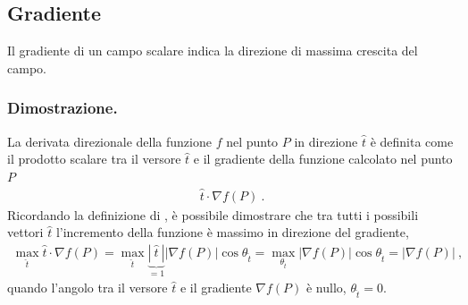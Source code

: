 \documentclass[letterpaper,10pt,english]{jupyterBook}
\begin{document}
\subsection{Gradiente}
\label{\detokenize{ch/vector-calculus/derivatives:gradiente}}
\sphinxAtStartPar
{} 

\sphinxAtStartPar
{} Il gradiente di un campo scalare indica la direzione  di massima crescita del campo.
\subsubsection*{Dimostrazione.}

\sphinxAtStartPar
La derivata direzionale della funzione \(f\) nel punto \(P\) in direzione \(\hat{t}\) è definita come il prodotto scalare tra il versore \(\hat{t}\) e il gradiente della funzione calcolato nel punto \(P\)
\begin{equation*}
\begin{split}\hat{t} \cdot \nabla f(P) \ .\end{split}
\end{equation*}
\sphinxAtStartPar
Ricordando la definizione di {\hyperref[\detokenize{ch/algebra/vector-algebra-euclidean-space:math-hs-algebra-vector-euclidean-space-inner-product}]{}}, è possibile dimostrare che tra tutti i possibili vettori \(\hat{t}\) l’incremento della funzione è massimo in direzione del gradiente,
\begin{equation*}
\begin{split}\max_{\hat{t}} \hat{t} \cdot \nabla f(P) = \max_{\hat{t}} \underbrace{|\ \hat{t} \ |}_{=1} |\nabla f(P)| \cos \theta_{\hat{t}} = \max_{\theta_{\hat{t}}} |\nabla f(P)| \cos \theta_{\hat{t}} = |\nabla f(P)| \ ,\end{split}
\end{equation*}
\sphinxAtStartPar
quando l’angolo tra il versore \(\hat{t}\) e il gradiente \(\nabla f(P)\) è nullo, \(\theta_{\hat{t}} = 0\).
\end{document}
